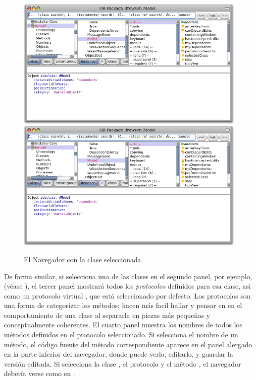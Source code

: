 \documentclass[a4paper,10pt,twoside]{book}
\begin{document}
\begin{figure}[htbp]
   \centering
   \ifluluelse
	   {\includegraphics[width=\textwidth]{SystemBrowser1} }
	   {\includegraphics[width=.7\textwidth]{SystemBrowser1} }
   \caption{El Navegador con la clase  seleccionada
   }
\end{figure}

De forma similar, si selecciona una de las clases en el segundo panel, por ejemplo,  (v\'ease ), el tercer panel mostrar\'a todos los \emph{protocolos} definidos para esa clase, asi como un protocolo virtual , que est\'a seleccionado por defecto. 
Los protocolos son una forma de categorizar los m\'etodos; hacen m\'as facil hallar y pensar en en el comportamiento de una clase al separarla en piezas m\'as pequeñas y conceptualmente coherentes.
El cuarto panel muestra los nombres de todos los m\'etodos definidos en el protocolo seleccionado.
Si selecciona el nombre de un m\'etodo, el c\'odigo fuente del m\'etodo correspondiente aparece en el panel alergado en la parte inferior del navegador, donde puede verlo, editarlo, y guardar la versi\'on editada.
Si selecciona la clase , el protocolo  y el m\'etodo , el navegador deber\'ia verse como en .
\end{document}
